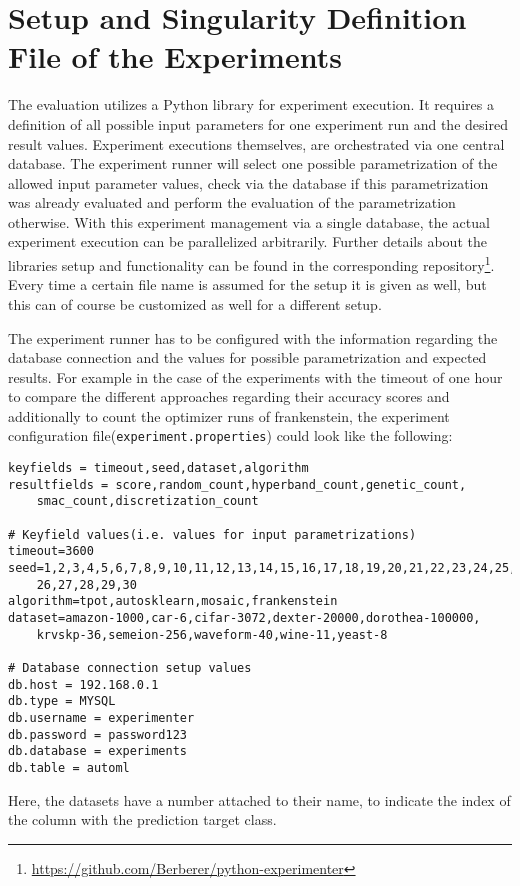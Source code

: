 \Blindtext[1][1]

\section{Setup and Singularity Definition File of the Experiments}
\label{sec:appendix:singularity}
The evaluation utilizes a Python library for experiment execution.
It requires a definition of all possible input parameters for one experiment run and the desired result values.\newline
Experiment executions themselves, are orchestrated via one central database.
The experiment runner will select one possible parametrization of the allowed input parameter values, check via the database if this parametrization was already evaluated and perform the evaluation of the parametrization otherwise.
With this experiment management via a single database, the actual experiment execution can be parallelized arbitrarily.
Further details about the libraries setup and functionality can be found in the corresponding repository\footnote{\url{https://github.com/Berberer/python-experimenter}}.\newline
Every time a certain file name is assumed for the setup it is given as well, but this can of course be customized as well for a different setup.

The experiment runner has to be configured with the information regarding the database connection and the values for possible parametrization and expected results.
For example in the case of the experiments with the timeout of one hour to compare the different approaches regarding their accuracy scores and additionally to count the optimizer runs of frankenstein, the experiment configuration file(\texttt{experiment.properties}) could look like the following:
\begin{Verbatim}[fontsize=\scriptsize]
keyfields = timeout,seed,dataset,algorithm
resultfields = score,random_count,hyperband_count,genetic_count,
    smac_count,discretization_count

# Keyfield values(i.e. values for input parametrizations)
timeout=3600
seed=1,2,3,4,5,6,7,8,9,10,11,12,13,14,15,16,17,18,19,20,21,22,23,24,25,
    26,27,28,29,30
algorithm=tpot,autosklearn,mosaic,frankenstein
dataset=amazon-1000,car-6,cifar-3072,dexter-20000,dorothea-100000,
    krvskp-36,semeion-256,waveform-40,wine-11,yeast-8

# Database connection setup values
db.host = 192.168.0.1
db.type = MYSQL
db.username = experimenter
db.password = password123
db.database = experiments
db.table = automl
\end{Verbatim}
Here, the datasets have a number attached to their name, to indicate the index of the column with the prediction target class.

